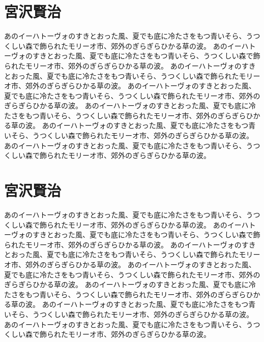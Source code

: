 \documentclass[b5j]{jsbook}
\begin{document}
\section{宮沢賢治}

あのイーハトーヴォのすきとおった風、夏でも底に冷たさをもつ青いそら、うつくしい森で飾られたモリーオ市、郊外のぎらぎらひかる草の波。
あのイーハトーヴォのすきとおった風、夏でも底に冷たさをもつ青いそら、うつくしい森で飾られたモリーオ市、郊外のぎらぎらひかる草の波。
あのイーハトーヴォのすきとおった風、夏でも底に冷たさをもつ青いそら、うつくしい森で飾られたモリーオ市、郊外のぎらぎらひかる草の波。
あのイーハトーヴォのすきとおった風、夏でも底に冷たさをもつ青いそら、うつくしい森で飾られたモリーオ市、郊外のぎらぎらひかる草の波。
あのイーハトーヴォのすきとおった風、夏でも底に冷たさをもつ青いそら、うつくしい森で飾られたモリーオ市、郊外のぎらぎらひかる草の波。
あのイーハトーヴォのすきとおった風、夏でも底に冷たさをもつ青いそら、うつくしい森で飾られたモリーオ市、郊外のぎらぎらひかる草の波。
あのイーハトーヴォのすきとおった風、夏でも底に冷たさをもつ青いそら、うつくしい森で飾られたモリーオ市、郊外のぎらぎらひかる草の波。

\section{宮沢賢治}

あのイーハトーヴォのすきとおった風、夏でも底に冷たさをもつ青いそら、うつくしい森で飾られたモリーオ市、郊外のぎらぎらひかる草の波。
あのイーハトーヴォのすきとおった風、夏でも底に冷たさをもつ青いそら、うつくしい森で飾られたモリーオ市、郊外のぎらぎらひかる草の波。
あのイーハトーヴォのすきとおった風、夏でも底に冷たさをもつ青いそら、うつくしい森で飾られたモリーオ市、郊外のぎらぎらひかる草の波。
あのイーハトーヴォのすきとおった風、夏でも底に冷たさをもつ青いそら、うつくしい森で飾られたモリーオ市、郊外のぎらぎらひかる草の波。
あのイーハトーヴォのすきとおった風、夏でも底に冷たさをもつ青いそら、うつくしい森で飾られたモリーオ市、郊外のぎらぎらひかる草の波。
あのイーハトーヴォのすきとおった風、夏でも底に冷たさをもつ青いそら、うつくしい森で飾られたモリーオ市、郊外のぎらぎらひかる草の波。
あのイーハトーヴォのすきとおった風、夏でも底に冷たさをもつ青いそら、うつくしい森で飾られたモリーオ市、郊外のぎらぎらひかる草の波。
\end{document}

